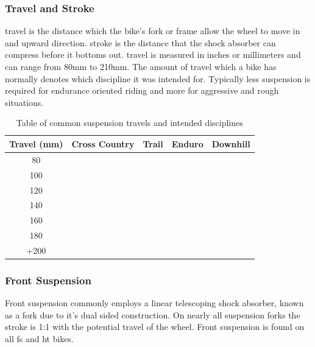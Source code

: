 \documentclass[a4paper, 12pt, hidelinks]{article}
\begin{document}
	\subsubsection{Travel and Stroke} 
		\Gls{travel} is the distance which the bike's fork or frame allow the wheel to move in and upward direction. \Gls{stroke} is the distance that the shock absorber can compress before it bottoms out. \Gls{travel} is measured in inches or millimeters and can range from 80mm to 210mm. The amount of \gls{travel} which a bike has normally denotes which discipline it was intended for. Typically less suspension is required for endurance oriented riding and more for aggressive and rough situations.
		\begin{table}[h!]
		\centering
		\caption{Table of common suspension \glspl{travel} and intended disciplines}
		\label{tab:table1}
		\begin{tabular}{|c|cccc|}
			\hline
			Travel (mm)&Cross Country&Trail&Enduro&Downhill\\
			\hline
			80&\cellcolor[gray]{0.5}&&&
			\\
			100&\cellcolor[gray]{0.5}&&&
			\\
			120&\cellcolor[gray]{0.5}&\cellcolor[gray]{0.5}&&
			\\
			140&&\cellcolor[gray]{0.5}&\cellcolor[gray]{0.5}&
			\\
			160&&&\cellcolor[gray]{0.5}&
			\\
			180&&&\cellcolor[gray]{0.5}&\cellcolor[gray]{0.5}
			\\
			+200&&&&\cellcolor[gray]{0.5}\\
			\hline
		\end{tabular}
	\end{table}
	\subsubsection{Front Suspension}
		Front suspension commonly employs a linear telescoping shock absorber, known as a \gls{fork} due to it's dual sided construction. On nearly all suspension \glspl{fork} the \gls{stroke} is 1:1 with the potential travel of the wheel. Front suspension is found on all \gls{fs} and \gls{ht} bikes.
\end{document}
